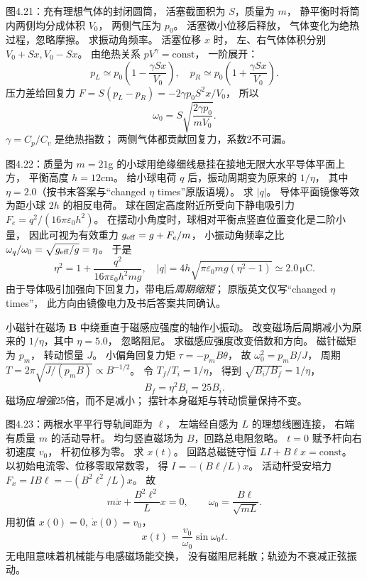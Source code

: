 图4.21：充有理想气体的封闭圆筒，
活塞截面积为 $S$，质量为 $m$，
静平衡时将筒内两侧均分成体积 $V_0$，
两侧气压为 $p_0$。
活塞微小位移后释放，
气体变化为绝热过程，忽略摩擦。
求振动角频率。
\exsolution
活塞位移 $x$ 时，
左、右气体体积分别
$V_0+Sx,V_0-Sx$。
由绝热关系 $pV^\gamma=\mathrm{const}$，
一阶展开：
\[
p_L\simeq p_0\left(1-\frac{\gamma Sx}{V_0}\right),
\quad
p_R\simeq p_0\left(1+\frac{\gamma Sx}{V_0}\right).
\]
压力差给回复力
$F=S(p_L-p_R)
=-2\gamma p_0S^2x/V_0$，
所以
\[
\boxed{\omega_0=S
\sqrt{\frac{2\gamma p_0}{mV_0}}}.
\]
\excheck $\gamma=C_p/C_v$ 是绝热指数；
两侧气体都贡献回复力，系数2不可漏。

图4.22：质量为 $m=21$g 的小球用绝缘细线悬挂在接地无限大水平导体平面上方，
平衡高度 $h=12$cm。
给小球电荷 $q$ 后，振动周期变为原来的 $1/\eta$，
其中 $\eta=2.0$（按书末答案与“changed $\eta$ times”原版语境）。
求 $|q|$。
\exsolution
导体平面镜像等效为距小球 $2h$ 的相反电荷。
球在固定高度附近所受向下静电吸引力
$F_e=q^2/(16\pi\varepsilon_0h^2)$。
在摆动小角度时，球相对平衡点竖直位置变化是二阶小量，
因此可视为有效重力
$g_{\rm eff}=g+F_e/m$，
小振动角频率之比
$\omega_q/\omega_0=\sqrt{g_{\rm eff}/g}=\eta$。
于是
\[
\eta^2=1+\frac{q^2}{16\pi\varepsilon_0h^2mg},
\quad
\boxed{|q|=4h\sqrt{\pi\varepsilon_0mg(\eta^2-1)}
\simeq2.0\,\mathrm{\mu C}}.
\]
\excheck 由于导体吸引加强向下回复力，带电后\emph{周期缩短}；
原版英文仅写“changed $\eta$ times”，
此方向由镜像电力及书后答案共同确认。

小磁针在磁场 $\bm B$ 中绕垂直于磁感应强度的轴作小振动。
改变磁场后周期减小为原来的
$1/\eta$，其中 $\eta=5.0$，
忽略阻尼。
求磁感应强度改变倍数和方向。
\exsolution
磁针磁矩为 $p_m$，
转动惯量 $J$。
小偏角回复力矩
$\tau=-p_mB\theta$，
故
$\omega_0^2=p_mB/J$，
周期
$T=2\pi\sqrt{J/(p_mB)}\propto B^{-1/2}$。
令 $T_f/T_i=1/\eta$，
得到
$\sqrt{B_i/B_f}=1/\eta$，
\[
\boxed{B_f=\eta^2B_i=25B_i}.
\]
\excheck 磁场应\emph{增强}25倍，而不是减小；
摆针本身磁矩与转动惯量保持不变。

图4.23：两根水平平行导轨间距为 $\ell$，
左端经自感为 $L$ 的理想线圈连接，
右端有质量 $m$ 的活动导杆。
均匀竖直磁场为 $B$，回路总电阻忽略。
$t=0$ 赋予杆向右初速度 $v_0$，
杆初位移为零。
求 $x(t)$。
\exsolution
回路总磁链守恒
$LI+B\ell x=\mathrm{const}$。
以初始电流零、位移零取常数零，
得
$I=-(B\ell/L)x$。
活动杆受安培力
$F_x=IB\ell=-(B^2\ell^2/L)x$。
故
\[
m\ddot x+\frac{B^2\ell^2}{L}x=0,
\qquad
\omega_0=\frac{B\ell}{\sqrt{mL}}.
\]
用初值 $x(0)=0,\ \dot x(0)=v_0$，
\[
\boxed{x(t)=\frac{v_0}{\omega_0}\sin\omega_0t}.
\]
\excheck 无电阻意味着机械能与电感磁场能交换，
没有磁阻尼耗散；轨迹为不衰减正弦振动。


